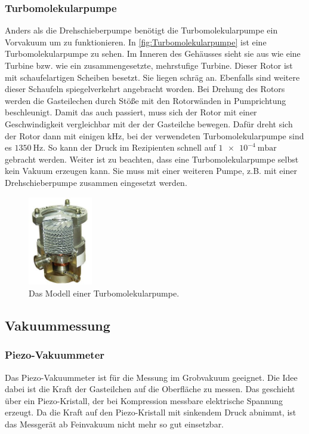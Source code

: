         \subsubsection{Turbomolekularpumpe}
            Anders als die Drehschieberpumpe benötigt die Turbomolekularpumpe ein Vorvakuum um zu funktionieren.
            In \autoref{fig:Turbomolekularpumpe} ist eine Turbomolekularpumpe zu sehen.
            Im Inneren des Gehäusses sieht sie aus wie eine Turbine bzw. wie ein zusammengesetzte, mehrstufige Turbine.
            Dieser Rotor ist mit schaufelartigen Scheiben besetzt.
            Sie liegen schräg an.
            Ebenfalls sind weitere dieser Schaufeln spiegelverkehrt angebracht worden.
            Bei Drehung des Rotors werden die Gasteilechen durch Stöße mit den Rotorwänden in Pumprichtung beschleunigt.
            Damit das auch passiert, muss sich der Rotor mit einer Geschwindigkeit vergleichbar mit der der Gasteilche bewegen.
            Dafür dreht sich der Rotor dann mit einigen $\si{\kilo\hertz}$, bei der verwendeten Turbomolekularpumpe sind es $\SI{1350}{\hertz}$.
            So kann der Druck im Rezipienten schnell auf $\SI{1e-4}{\milli\bar}$ gebracht werden.
            Weiter ist zu beachten, dass eine Turbomolekularpumpe selbst kein Vakuum erzeugen kann. 
            Sie muss mit einer weiteren Pumpe, z.B. mit einer Drehschieberpumpe zusammen eingesetzt werden.

        \begin{figure}[H]
            \centering
            \includegraphics[width=0.25\textwidth]{bilder/Turbomolekularpumpe}
            \caption{Das Modell einer Turbomolekularpumpe.\cite{turboBild}}
            \label{fig:Turbomolekularpumpe}
        \end{figure}

    \subsection{Vakuummessung}
        \subsubsection{Piezo-Vakuummeter}
            Das Piezo-Vakuummeter ist für die Messung im Grobvakuum geeignet.
            Die Idee dabei ist die Kraft der Gasteilchen auf die Oberfläche zu messen.
            Das geschieht über ein Piezo-Kristall, der bei Kompression messbare elektrische Spannung erzeugt.
            Da die Kraft auf den Piezo-Kristall mit sinkendem Druck abnimmt, ist das Messgerät ab Feinvakuum nicht mehr so gut einsetzbar.

